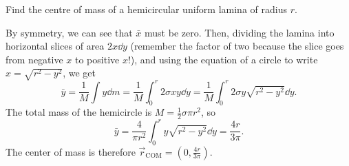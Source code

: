 \documentclass[../classical_mechanics.tex]{subfiles}
\begin{document}
        \begin{example}
            Find the centre of mass of a hemicircular uniform lamina of radius $r$.
            \begin{figure}[H]
                \centering
            \end{figure}

            By symmetry, we can see that $\bar{x}$ must be zero.
            Then, dividing the lamina into horizontal slices of area $2x\dd{y}$ (remember the factor of two because the slice goes from negative $x$ to positive $x$!), and using the equation of a circle to write $x=\sqrt{r^2-y^2}$, we get
            \begin{equation}
                \bar{y}=\frac{1}{M}\int y\dd{m}=\frac{1}{M}\int_0^r2\sigma xy\dd{y}=\frac{1}{M}\int_0^r2\sigma y\sqrt{r^2-y^2}\dd{y}.
            \end{equation}
            The total mass of the hemicircle is $M=\frac{1}{2}\sigma\pi r^2$, so
            \begin{equation}
                \bar{y}=\frac{4}{\pi r^2}\int_0^ry\sqrt{r^2-y^2}\dd{y}=\frac{4r}{3\pi}.
            \end{equation}
            The center of mass is therefore $\vec{r}_\text{COM}=\left(0,\frac{4r}{3\pi}\right)$.
        \end{example}
\end{document}
